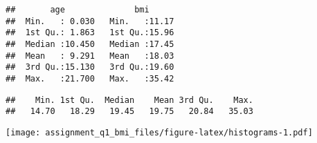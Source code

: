 \begin{verbatim}
##       age              bmi       
##  Min.   : 0.030   Min.   :11.17  
##  1st Qu.: 1.863   1st Qu.:15.96  
##  Median :10.450   Median :17.45  
##  Mean   : 9.291   Mean   :18.03  
##  3rd Qu.:15.130   3rd Qu.:19.60  
##  Max.   :21.700   Max.   :35.42
\end{verbatim}

\begin{Shaded}
\begin{Highlighting}[]
\OtherTok{\textless{}{-}} 
\OtherTok{\textless{}{-}} \SpecialCharTok{\textgreater{}}\SpecialCharTok{\&}\SpecialCharTok{\textless{}}\SpecialCharTok{+} \NormalTok{))}
\OtherTok{\textless{}{-}}\SpecialCharTok{$}
\end{Highlighting}
\end{Shaded}

\begin{verbatim}
##    Min. 1st Qu.  Median    Mean 3rd Qu.    Max. 
##   14.70   18.29   19.45   19.75   20.84   35.03
\end{verbatim}

\begin{Shaded}
\begin{Highlighting}[]
\OtherTok{=} 
\OtherTok{=} \NormalTok{(}\SpecialCharTok{{-}} \SpecialCharTok{/}

\end{Highlighting}
\end{Shaded}

\texttt{[image: assignment\_q1\_bmi\_files/figure-latex/histograms-1.pdf]}

\begin{Shaded}
\begin{Highlighting}[]
 \NormalTok{)}
\end{Highlighting}
\end{Shaded}

